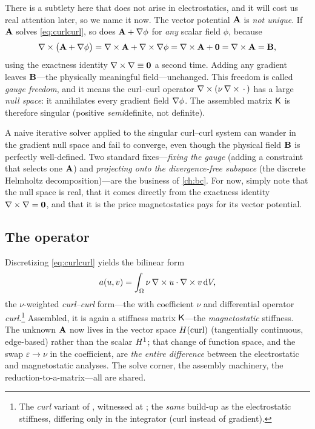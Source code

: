 There is a subtlety here that does not arise in electrostatics, and it will cost
us real attention later, so we name it now. The vector potential $\mathbf{A}$ is
\emph{not unique}. If $\mathbf{A}$ solves \cref{eq:curlcurl}, so does $\mathbf{A} + \nabla\phi$
for \emph{any} scalar field $\phi$, because
\begin{equation}
  \nabla\times\bigl(\mathbf{A} + \nabla\phi\bigr) = \nabla\times\mathbf{A} + \nabla\times\nabla\phi
    = \nabla\times\mathbf{A} + \mathbf 0 = \nabla\times\mathbf{A} = \mathbf{B},
\end{equation}
using the exactness identity $\nabla\times\nabla\equiv\mathbf0$ a second time. Adding any
gradient leaves $\mathbf{B}$---the physically meaningful field---unchanged. This freedom
is called \emph{gauge freedom}, and it means the curl--curl operator
$\nabla\times(\nu\,\nabla\times\,\cdot\,)$ has a large \emph{null space}: it annihilates every
gradient field $\nabla\phi$. The assembled matrix $\mathsf{K}$ is therefore singular
(positive \emph{semi}definite, not definite).

\begin{pitfall}
A naive iterative solver applied to the singular curl--curl system can wander in
the gradient null space and fail to converge, even though the physical field
$\mathbf{B}$ is perfectly well-defined. Two standard fixes---\emph{fixing the gauge}
(adding a constraint that selects one $\mathbf{A}$) and \emph{projecting onto the
divergence-free subspace} (the discrete Helmholtz decomposition)---are the
business of \cref{ch:bc}. For now, simply note that the null space is real, that
it comes directly from the exactness identity $\nabla\times\nabla=\mathbf0$, and that it
is the price magnetostatics pays for its vector potential.
\end{pitfall}

\subsection{The operator}

Discretizing \cref{eq:curlcurl} yields the bilinear form
\begin{equation}
  a(u,v) = \int_\Omega \nu\,\nabla\times u\cdot\nabla\times v \,\mathrm{d}V,
  \label{eq:ms-bilinear}
\end{equation}
the $\nu$-weighted \emph{curl--curl} form---the  with
coefficient $\nu$ and differential operator \emph{curl}.\footnote{The
\emph{curl} variant of , witnessed at
; the \emph{same}
 build-up as the electrostatic stiffness, differing only in
the integrator (curl instead of gradient).} Assembled, it is again a stiffness
matrix $\mathsf{K}$---the \emph{magnetostatic} stiffness. The unknown $\mathbf{A}$ now lives
in the vector space $H(\mathrm{curl})$ (tangentially continuous, edge-based) rather than
the scalar $H^1$; that change of function space, and the swap
$\varepsilon\to\nu$ in the coefficient, are \emph{the entire difference} between
the electrostatic and magnetostatic analyses. The solve corner, the assembly
machinery, the reduction-to-a-matrix---all are shared.

